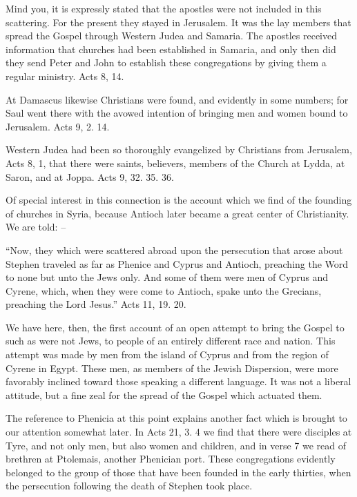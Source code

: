 \documentclass[
]{book}
\begin{document}
Mind you, it is expressly stated that the apostles were not included in this scattering. For the present they stayed in Jerusalem. It was the lay members that spread the Gospel through Western Judea and Samaria. The apostles received information that churches had been established in Samaria, and only then did they send Peter and John to establish these congregations by giving them a regular ministry. Acts 8, 14.

At Damascus likewise Christians were found, and evidently in some numbers; for Saul went there with the avowed intention of bringing men and women bound to Jerusalem. Acts 9, 2. 14.

Western Judea had been so thoroughly evangelized by Christians from Jerusalem, Acts 8, 1, that there were saints, believers, members of the Church at Lydda, at Saron, and at Joppa. Acts 9, 32. 35. 36.

Of special interest in this connection is the account which we find of the founding of churches in Syria, because Antioch later became a great center of Christianity. We are told: --

``Now, they which were scattered abroad upon the persecution that arose about Stephen traveled as far as Phenice and Cyprus and Antioch, preaching the Word to none but unto the Jews only. And some of them were men of Cyprus and Cyrene, which, when they were come to Antioch, spake unto the Grecians, preaching the Lord Jesus.'' Acts 11, 19. 20.

We have here, then, the first account of an open attempt to bring the Gospel to such as were not Jews, to people of an entirely different race and nation. This attempt was made by men from the island of Cyprus and from the region of Cyrene in Egypt. These men, as members of the Jewish Dispersion, were more favorably inclined toward those speaking a different language. It was not a liberal attitude, but a fine zeal for the spread of the Gospel which actuated them.

The reference to Phenicia at this point explains another fact which is brought to our attention somewhat later. In Acts 21, 3. 4 we find that there were disciples at Tyre, and not only men, but also women and children, and in verse 7 we read of brethren at Ptolemais, another Phenician port. These congregations evidently belonged to the group of those that have been founded in the early thirties, when the persecution following the death of Stephen took place.
\end{document}
